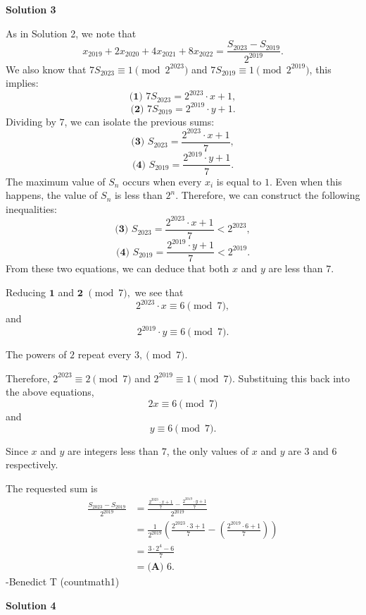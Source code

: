 \begin{enumerate}
 



\textbf{Solution 3}

As in Solution 2, we note that 
 \[x_{2019}+2x_{2020}+4x_{2021}+8x_{2022}=\frac{S_{2023}-S_{2019}}{2^{2019}}.\]We also know that $7S_{2023} \equiv 1 \pmod{2^{2023}}$ and $7S_{2019} \equiv 1 \pmod{2^{2019}}$, this implies:
 \[\textbf{(1) } 7S_{2023}=2^{2023}\cdot{x} + 1,\]
 \[\textbf{(2) } 7S_{2019}=2^{2019}\cdot{y} + 1.\]Dividing by $7$, we can isolate the previous sums:
 \[\textbf{(3) } S_{2023}=\frac{2^{2023}\cdot{x} + 1}{7},\]
 \[\textbf{(4) } S_{2019}=\frac{2^{2019}\cdot{y} + 1}{7}.\]The maximum value of $S_n$ occurs when every $x_i$ is equal to $1$. Even when this happens, the value of $S_n$ is less than $2^n$. Therefore, we can construct the following inequalities:
 \[\textbf{(3) } S_{2023}=\frac{2^{2023}\cdot{x} + 1}{7} < 2^{2023},\]
 \[\textbf{(4) } S_{2019}=\frac{2^{2019}\cdot{y} + 1}{7} < 2^{2019}.\]From these two equations, we can deduce that both $x$ and $y$ are less than $7$. 

 Reducing $\textbf{1}$ and $\textbf{2}$ $\pmod{7},$ we see that 
 \[2^{2023}\cdot{x}\equiv 6\pmod{7},\]and 
 \[2^{2019}\cdot{y}\equiv 6\pmod{7}.\]

 The powers of $2$ repeat every $3, \pmod{7}.$ 

 Therefore, $2^{2023}\equiv 2 \pmod 7$ and $2^{2019} \equiv 1 \pmod {7}.$ Substituing this back into the above equations, 
 \[2x\equiv{6}\pmod{7}\]and
 \[y\equiv{6}\pmod{7}.\]

 Since $x$ and $y$ are integers less than $7$, the only values of $x$ and $y$ are $3$ and $6$ respectively. 

 The requested sum is 
 \begin{align*} \frac{S_{2023}-S_{2019}}{2^{2019}} &= \frac{\frac{2^{2023}\cdot{x} + 1}{7} - \frac{2^{2019}\cdot{y} + 1}{7}}{2^{2019}} \\ &= \frac{1}{2^{2019}}\left(\frac{2^{2023}\cdot{3} + 1}{7} -\left(\frac{2^{2019}\cdot{6} + 1}{7}  \right)\right) \\ &= \frac{3\cdot{2^4}-6}{7} \\ &= \boxed{\textbf{(A) } 6}. \end{align*}
-Benedict T (countmath1)

 



\textbf{Solution 4}


\end{enumerate}
